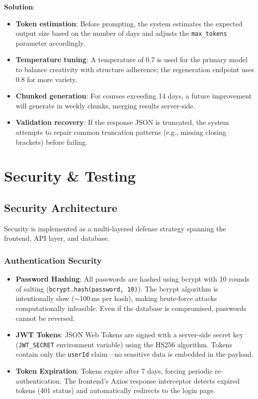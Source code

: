 \documentclass[12pt,a4paper]{report}
\begin{document}
\textbf{Solution}:
\begin{itemize}[noitemsep]
    \item \textbf{Token estimation}: Before prompting, the system estimates the expected output size based on the number of days and adjusts the \texttt{max\_tokens} parameter accordingly.
    \item \textbf{Temperature tuning}: A temperature of 0.7 is used for the primary model to balance creativity with structure adherence; the regeneration endpoint uses 0.8 for more variety.
    \item \textbf{Chunked generation}: For courses exceeding 14 days, a future improvement will generate in weekly chunks, merging results server-side.
    \item \textbf{Validation recovery}: If the response JSON is truncated, the system attempts to repair common truncation patterns (e.g., missing closing brackets) before failing.
\end{itemize}


\chapter{Security \& Testing}

\section{Security Architecture}
Security is implemented as a multi-layered defense strategy spanning the frontend, API layer, and database.

\subsection{Authentication Security}
\begin{itemize}
    \item \textbf{Password Hashing}: All passwords are hashed using bcrypt with 10 rounds of salting (\texttt{bcrypt.hash(password, 10)}). The bcrypt algorithm is intentionally slow ($\sim$100\,ms per hash), making brute-force attacks computationally infeasible. Even if the database is compromised, passwords cannot be reversed.
    \item \textbf{JWT Tokens}: JSON Web Tokens are signed with a server-side secret key (\texttt{JWT\_SECRET} environment variable) using the HS256 algorithm. Tokens contain only the \texttt{userId} claim---no sensitive data is embedded in the payload.
    \item \textbf{Token Expiration}: Tokens expire after 7 days, forcing periodic re-authentication. The frontend's Axios response interceptor detects expired tokens (401 status) and automatically redirects to the login page.
\end{itemize}
\end{document}
